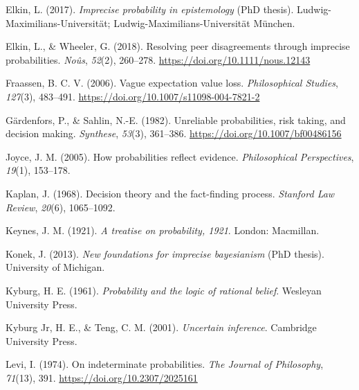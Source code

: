 \documentclass[
  10pt,
  dvipsnames,enabledeprecatedfontcommands]{scrartcl}
\newlength{\cslhangindent}
\newlength{\cslentryspacingunit} %
\newenvironment{CSLReferences}[2] %
 {%
  \setlength{\parindent}{0pt}
  \ifodd #1
  \let\oldpar\par
  \def\par{\hangindent=\cslhangindent\oldpar}
  \fi
  \setlength{\parskip}{#2\cslentryspacingunit}
 }%
 {}
\begin{document}
\begin{CSLReferences}{1}{0}
\leavevmode{}%
Elkin, L. (2017). \emph{Imprecise probability in epistemology} (PhD
thesis). Ludwig-Maximilians-Universit{ä}t;
Ludwig-Maximilians-Universität München.

\leavevmode{}%
Elkin, L., \& Wheeler, G. (2018). Resolving peer disagreements through
imprecise probabilities. \emph{Noûs}, \emph{52}(2), 260--278.
\url{https://doi.org/10.1111/nous.12143}

\leavevmode{}%
Fraassen, B. C. V. (2006). Vague expectation value loss.
\emph{Philosophical Studies}, \emph{127}(3), 483--491.
\url{https://doi.org/10.1007/s11098-004-7821-2}

\leavevmode{}%
Gärdenfors, P., \& Sahlin, N.-E. (1982). Unreliable probabilities, risk
taking, and decision making. \emph{Synthese}, \emph{53}(3), 361--386.
\url{https://doi.org/10.1007/bf00486156}

\leavevmode{}%
Joyce, J. M. (2005). How probabilities reflect evidence.
\emph{Philosophical Perspectives}, \emph{19}(1), 153--178.

\leavevmode{}%
Kaplan, J. (1968). Decision theory and the fact-finding process.
\emph{Stanford Law Review}, \emph{20}(6), 1065--1092.

\leavevmode{}%
Keynes, J. M. (1921). \emph{A treatise on probability, 1921}. London:
Macmillan.

\leavevmode{}%
Konek, J. (2013). \emph{New foundations for imprecise bayesianism} (PhD
thesis). University of Michigan.

\leavevmode{}%
Kyburg, H. E. (1961). \emph{Probability and the logic of rational
belief}. Wesleyan University Press.

\leavevmode{}%
Kyburg Jr, H. E., \& Teng, C. M. (2001). \emph{Uncertain inference}.
Cambridge University Press.

\leavevmode{}%
Levi, I. (1974). On indeterminate probabilities. \emph{The Journal of
Philosophy}, \emph{71}(13), 391. \url{https://doi.org/10.2307/2025161}


\end{CSLReferences}
\end{document}
